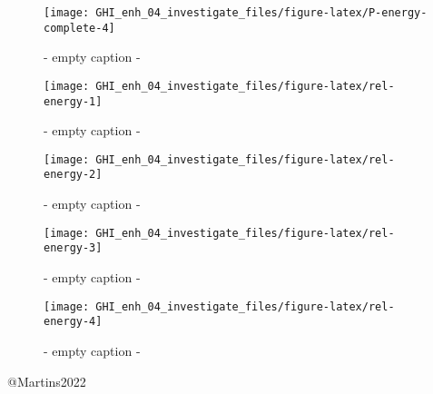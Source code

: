 \documentclass[
  10pt,
  a4paper,oneside]{article}
\begin{document}
\begin{figure}[H]

{\centering \texttt{[image: GHI\_enh\_04\_investigate\_files/figure-latex/P-energy-complete-4]} 

}

\caption{ - empty caption - }\label{fig:P-energy-complete-4}
\end{figure}
\begin{figure}[H]

{\centering \texttt{[image: GHI\_enh\_04\_investigate\_files/figure-latex/rel-energy-1]} 

}

\caption{ - empty caption - }\label{fig:rel-energy-1}
\end{figure}
\begin{figure}[H]

{\centering \texttt{[image: GHI\_enh\_04\_investigate\_files/figure-latex/rel-energy-2]} 

}

\caption{ - empty caption - }\label{fig:rel-energy-2}
\end{figure}
\begin{figure}[H]

{\centering \texttt{[image: GHI\_enh\_04\_investigate\_files/figure-latex/rel-energy-3]} 

}

\caption{ - empty caption - }\label{fig:rel-energy-3}
\end{figure}
\begin{figure}[H]

{\centering \texttt{[image: GHI\_enh\_04\_investigate\_files/figure-latex/rel-energy-4]} 

}

\caption{ - empty caption - }\label{fig:rel-energy-4}
\end{figure}

@Martins2022
\end{document}
